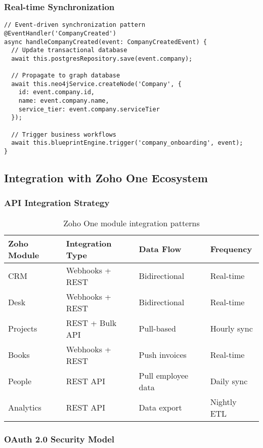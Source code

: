 \subsubsection{Real-time Synchronization}

\begin{verbatim}
// Event-driven synchronization pattern
@EventHandler('CompanyCreated')
async handleCompanyCreated(event: CompanyCreatedEvent) {
  // Update transactional database
  await this.postgresRepository.save(event.company);
  
  // Propagate to graph database
  await this.neo4jService.createNode('Company', {
    id: event.company.id,
    name: event.company.name,
    service_tier: event.company.serviceTier
  });
  
  // Trigger business workflows
  await this.blueprintEngine.trigger('company_onboarding', event);
}
\end{verbatim}

\subsection{Integration with Zoho One Ecosystem}

\subsubsection{API Integration Strategy}

\begin{table}[h]
\centering
\begin{tabular}{|l|l|l|l|}
\hline
\textbf{Zoho Module} & \textbf{Integration Type} & \textbf{Data Flow} & \textbf{Frequency} \\
\hline
CRM & Webhooks + REST & Bidirectional & Real-time \\
\hline
Desk & Webhooks + REST & Bidirectional & Real-time \\
\hline
Projects & REST + Bulk API & Pull-based & Hourly sync \\
\hline
Books & Webhooks + REST & Push invoices & Real-time \\
\hline
People & REST API & Pull employee data & Daily sync \\
\hline
Analytics & REST API & Data export & Nightly ETL \\
\hline
\end{tabular}
\caption{Zoho One module integration patterns}
\end{table}

\subsubsection{OAuth 2.0 Security Model}

